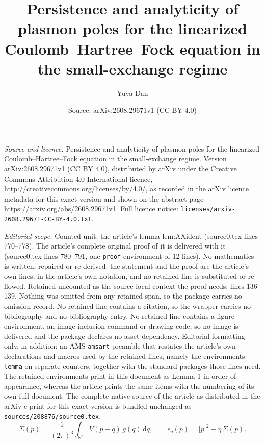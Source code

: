 \documentclass[10pt,a4paper]{amsart}
\title{Persistence and analyticity of plasmon poles for the linearized Coulomb--Hartree--Fock equation in the small-exchange regime}
\author{Yuya Dan}
\date{Source: arXiv:2608.29671v1 (CC BY 4.0)}
\newcommand{\R}{\mathbb{R}}
\newcommand{\dd}{\,\mathrm{d}}
\begin{document}
\maketitle

\noindent\emph{Source and licence.} Persistence and analyticity of plasmon poles for the linearized Coulomb--Hartree--Fock equation in the small-exchange regime. Version arXiv:2608.29671v1 (CC BY 4.0), distributed by arXiv under the Creative Commons Attribution 4.0 International licence, http://creativecommons.org/licenses/by/4.0/, as recorded in the arXiv licence metadata for this exact version and shown on the abstract page https://arxiv.org/abs/2608.29671v1. Full licence notice: \texttt{licenses/arxiv-2608.29671-CC-BY-4.0.txt}.\par\smallskip

\noindent\textit{Editorial scope.} Counted unit: the article's lemma lem:AXident (source0.tex lines 770--778). The article's complete original proof of it is delivered with it (source0.tex lines 780--791, one \texttt{proof} environment of 12 lines). No mathematics is written, repaired or re-derived: the statement and the proof are the article's own lines, in the article's own notation, and no retained line is substituted or re-flowed.  Retained uncounted as the source-local context the proof needs: lines 136--139.  Nothing was omitted from any retained span, so the package carries no omission record.  No retained line contains a citation, so the wrapper carries no bibliography and no bibliography entry.  No retained line contains a figure environment, an image-inclusion command or drawing code, so no image is delivered and the package declares no asset dependency.  Editorial formatting only, in addition: an AMS \texttt{amsart} preamble that restates the article's own declarations and macros used by the retained lines, namely the environments \texttt{lemma} on separate counters, together with the standard packages those lines need.  The retained environments print in this document as Lemma 1 in order of appearance, whereas the article prints the same items with the numbering of its own full document.  The complete native source of the article as distributed in the arXiv e-print for this exact version is bundled unchanged as \texttt{sources/208876/source0.tex}.
\begin{equation}\label{eq:selfenergy}
\Sigma(p)=\frac{1}{(2\pi)^3}\int_{\R^3}V(p-q)\,g(q)\dd q,\qquad
\epsilon_\eta(p)=|p|^2-\eta\,\Sigma(p).
\end{equation}
\end{document}
